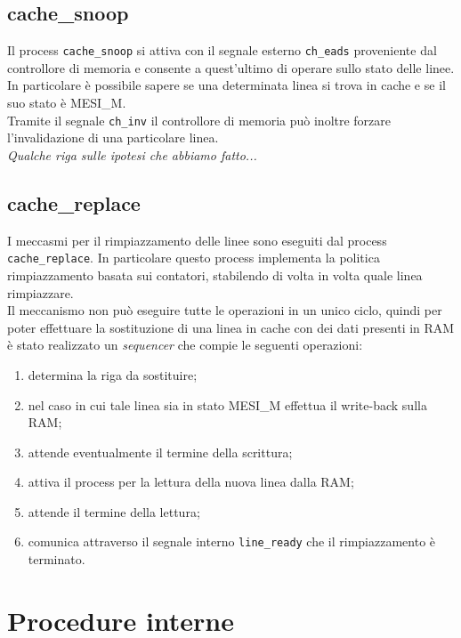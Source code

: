 \subsection{cache\_snoop}

Il process \texttt{cache\_snoop} si attiva con il segnale esterno \texttt{ch\_eads} proveniente dal controllore di memoria e consente a quest'ultimo di operare sullo stato delle linee.\\
In particolare \`e possibile sapere se una determinata linea si trova in cache e se il suo stato \`e MESI\_M.\\
Tramite il segnale \texttt{ch\_inv} il controllore di memoria pu\`o inoltre forzare l'invalidazione di una particolare linea.\\

\emph{Qualche riga sulle ipotesi che abbiamo fatto...}

\subsection{cache\_replace}

I meccasmi per il rimpiazzamento delle linee sono eseguiti dal process \texttt{cache\_replace}. In particolare questo process implementa la politica rimpiazzamento basata sui contatori, stabilendo di volta in volta quale linea rimpiazzare.\\

Il meccanismo non pu\`o eseguire tutte le operazioni in un unico ciclo, quindi per poter effettuare la sostituzione di una linea in cache con dei dati presenti in RAM \`e stato realizzato un \emph{sequencer} che compie le seguenti operazioni:
\begin{enumerate}
  \item determina la riga da sostituire;
  \item nel caso in cui tale linea sia in stato MESI\_M effettua il write-back sulla RAM;
  \item attende eventualmente il termine della scrittura;
  \item attiva il process per la lettura della nuova linea dalla RAM;
  \item attende il termine della lettura;
  \item comunica attraverso il segnale interno \texttt{line\_ready} che il rimpiazzamento \`e terminato.
\end{enumerate}

\section{Procedure interne}

